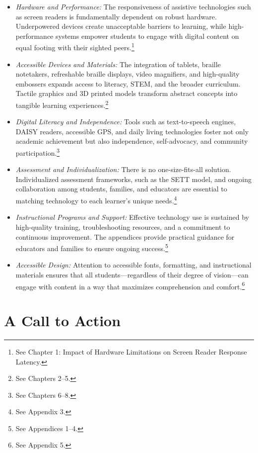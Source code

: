 \begin{itemize}
    \item \emph{Hardware and Performance:} The responsiveness of assistive technologies such as screen readers is fundamentally dependent on robust hardware. Underpowered devices create unacceptable barriers to learning, while high-performance systems empower students to engage with digital content on equal footing with their sighted peers.\footnote{See Chapter 1: Impact of Hardware Limitations on Screen Reader Response Latency.}
    \item \emph{Accessible Devices and Materials:} The integration of tablets, braille notetakers, refreshable braille displays, video magnifiers, and high-quality embossers expands access to literacy, STEM, and the broader curriculum. Tactile graphics and 3D printed models transform abstract concepts into tangible learning experiences.\footnote{See Chapters 2–5.}
    \item \emph{Digital Literacy and Independence:} Tools such as text-to-speech engines, DAISY readers, accessible GPS, and daily living technologies foster not only academic achievement but also independence, self-advocacy, and community participation.\footnote{See Chapters 6–8.}
    \item \emph{Assessment and Individualization:} There is no one-size-fits-all solution. Individualized assessment frameworks, such as the SETT model, and ongoing collaboration among students, families, and educators are essential to matching technology to each learner’s unique needs.\footnote{See Appendix 3.}
    \item \emph{Instructional Programs and Support:} Effective technology use is sustained by high-quality training, troubleshooting resources, and a commitment to continuous improvement. The appendices provide practical guidance for educators and families to ensure ongoing success.\footnote{See Appendices 1–4.}
    \item \emph{Accessible Design:} Attention to accessible fonts, formatting, and instructional materials ensures that all students—regardless of their degree of vision—can engage with content in a way that maximizes comprehension and comfort.\footnote{See Appendix 5.}
\end{itemize}

\section{A Call to Action}

